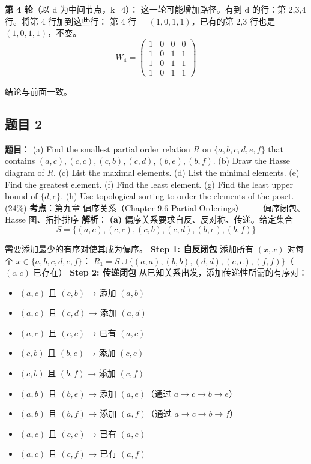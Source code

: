 \documentclass[10pt,a4paper,openany]{ctexbook}
\theoremstyle{definition}
\theoremstyle{remark}
\begin{document}
\textbf{第 4 轮}（以 d 为中间节点，k=4）：
这一轮可能增加路径。有到 d 的行：第 2,3,4 行。将第 4 行加到这些行：
第 4 行 = $(1,0,1,1)$，已有的第 2,3 行也是 $(1,0,1,1)$，不变。
\[
W_4 = \begin{pmatrix}
1 & 0 & 0 & 0 \\
1 & 0 & 1 & 1 \\
1 & 0 & 1 & 1 \\
1 & 0 & 1 & 1
\end{pmatrix}
\]

结论与前面一致。
\vspace{-2pt}

\subsection{题目 2}

\textbf{题目}：
(a) Find the smallest partial order relation $R$ on $\{a, b, c, d, e, f\}$ that contains $(a, c), (c, c), (c, b), (c, d), (b, e), (b, f)$.
(b) Draw the Hasse diagram of $R$.
(c) List the maximal elements.
(d) List the minimal elements.
(e) Find the greatest element.
(f) Find the least element.
(g) Find the least upper bound of $\{d, e\}$.
(h) Use topological sorting to order the elements of the poset. (24\%)
\textbf{考点}：第九章 偏序关系（Chapter 9.6 Partial Orderings）—— 偏序闭包、Hasse 图、拓扑排序
\textbf{解析}：
\textbf{(a)} 偏序关系要求自反、反对称、传递。给定集合
\[
S = \{(a,c), (c,c), (c,b), (c,d), (b,e), (b,f)\}
\]

需要添加最少的有序对使其成为偏序。
\textbf{Step 1: 自反闭包}
添加所有 $(x,x)$ 对每个 $x \in \{a,b,c,d,e,f\}$：
$R_1 = S \cup \{(a,a), (b,b), (d,d), (e,e), (f,f)\}$（$(c,c)$ 已存在）
\textbf{Step 2: 传递闭包}
从已知关系出发，添加传递性所需的有序对：
\begin{itemize}
\item $(a,c)$ 且 $(c,b)$ → 添加 $(a,b)$
\item $(a,c)$ 且 $(c,d)$ → 添加 $(a,d)$
\item $(a,c)$ 且 $(c,c)$ → 已有 $(a,c)$
\item $(c,b)$ 且 $(b,e)$ → 添加 $(c,e)$
\item $(c,b)$ 且 $(b,f)$ → 添加 $(c,f)$
\item $(a,b)$ 且 $(b,e)$ → 添加 $(a,e)$（通过 $a \to c \to b \to e$）
\item $(a,b)$ 且 $(b,f)$ → 添加 $(a,f)$（通过 $a \to c \to b \to f$）
\item $(a,c)$ 且 $(c,e)$ → 已有 $(a,e)$
\item $(a,c)$ 且 $(c,f)$ → 已有 $(a,f)$

\end{itemize}
\end{document}
